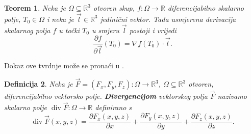 \documentclass[12pt,a4paper]{article}
\makeatletter
\newtheorem{tm}{Teorem}[section]
\newtheorem{deff}[tm]{Definicija}
\renewenvironment{proof}[1][\proofname]{\par
  \pushQED{\qed}%
  \normalfont
  \topsep6\p@\@plus6\p@\relax
  \trivlist
  \item[\hskip\labelsep
  \bfseries #1\@addpunct{.}]\ignorespaces
}{%
  \popQED\endtrivlist\@endpefalse
}
\makeatother
\begin{document}
\begin{tm}
Neka je $\Omega\subseteq\mathbb{R}^3$ otvoren skup,
$f:\Omega\to\mathbb{R}$ diferencijabilno skalarno polje,
$T_0\in\Omega$ i neka je $\overrightarrow{l}\in\mathbb{R}^3$
jedinični vektor. Tada usmjerena derivacija skalarnog polja $f$
u točki $T_0$ u smjeru $\overrightarrow{l}$ postoji i vrijedi
$$
\frac{\partial f}{\partial\overrightarrow{l}}(T_0)
=
\nabla f(T_0)\cdot\overrightarrow{l}.
$$
\end{tm}
\begin{proof}
Dokaz ove tvrdnje može se pronaći u \cite{uglesic}.
\end{proof}

\begin{deff}
Neka je
$\overrightarrow{F}=(F_x,F_y,F_z):\Omega\to\mathbb{R}^3$, $\Omega \subseteq \mathbb{R}^3$ otvoren,
diferencijabilno vektorsko polje.
\textbf{\textit{Divergencijom}} vektorskog polja $\overrightarrow{F}$ nazivamo skalarno
polje $\operatorname{div}\overrightarrow{F}:\Omega\to\mathbb{R}$ definirano s
$$
\operatorname{div}\overrightarrow{F}(x,y,z)
=
\frac{\partial F_x(x,y,z)}{\partial x}
+
\frac{\partial F_y(x,y,z)}{\partial y}
+
\frac{\partial F_z(x,y,z)}{\partial z}.
$$
\end{deff}
\end{document}
